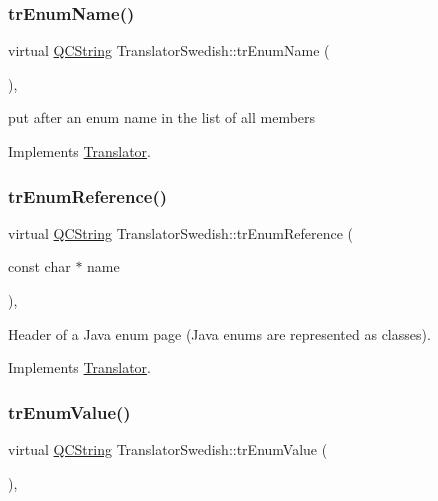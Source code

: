\mbox{\label{class_translator_swedish_a69f8b831cbed3c620be777ac2da344ec}} 
\subsubsection{\texorpdfstring{trEnumName()}{trEnumName()}}
{\footnotesize\ttfamily virtual \mbox{\hyperlink{class_q_c_string}{Q\+C\+String}} Translator\+Swedish\+::tr\+Enum\+Name (\begin{DoxyParamCaption}{ }\end{DoxyParamCaption})\hspace{0.3cm}{\ttfamily [inline]}, {\ttfamily [virtual]}}

put after an enum name in the list of all members 

Implements \mbox{\hyperlink{class_translator}{Translator}}.

\mbox{\label{class_translator_swedish_af27471f02beebe1a57b4faca2e46030b}} 
\subsubsection{\texorpdfstring{trEnumReference()}{trEnumReference()}}
{\footnotesize\ttfamily virtual \mbox{\hyperlink{class_q_c_string}{Q\+C\+String}} Translator\+Swedish\+::tr\+Enum\+Reference (\begin{DoxyParamCaption}\item[{const char $\ast$}]{name }\end{DoxyParamCaption})\hspace{0.3cm}{\ttfamily [inline]}, {\ttfamily [virtual]}}

Header of a Java enum page (Java enums are represented as classes). 

Implements \mbox{\hyperlink{class_translator}{Translator}}.

\mbox{\label{class_translator_swedish_aba634fd551777a6015808387d13e818d}} 
\subsubsection{\texorpdfstring{trEnumValue()}{trEnumValue()}}
{\footnotesize\ttfamily virtual \mbox{\hyperlink{class_q_c_string}{Q\+C\+String}} Translator\+Swedish\+::tr\+Enum\+Value (\begin{DoxyParamCaption}{ }\end{DoxyParamCaption})\hspace{0.3cm}{\ttfamily [inline]}, {\ttfamily [virtual]}}

